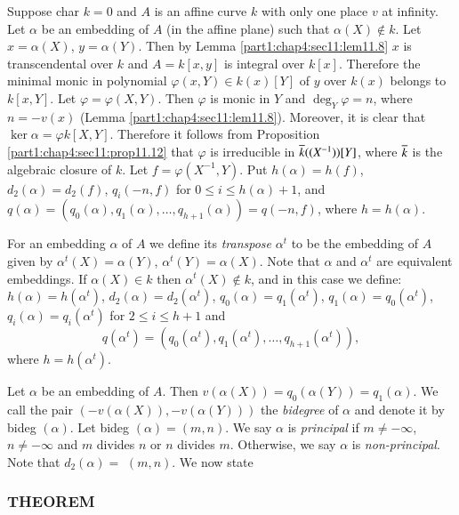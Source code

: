 Suppose char $k=0$ and $A$ is an affine curve $k$ with only one place
$v$ at infinity. Let $\alpha$ be an embedding of $A$ (in the affine
plane) such that $\alpha (X)\notin k$. Let $x= \alpha (X)$, $y= \alpha
(Y)$. Then by Lemma \ref{part1:chap4:sec11:lem11.8} $x$ is
transcendental over $k$ and $A = k[x, y]$ is integral over
$k[x]$. Therefore the minimal monic in polynomial $\varphi (x,Y) \in k (x)[Y]$ of $y$ over $k(x)$ belongs to $k[x,Y]$. Let $\varphi = \varphi (X,Y)$. Then $\varphi$ is monic in $Y$ and $\deg_Y \varphi=n$, where $n= - v(x)$ (Lemma \ref{part1:chap4:sec11:lem11.8}). Moreover,
it is clear that $\ker  \alpha = \varphi k[X, Y]$. Therefore it
follows from Proposition \ref{part1:chap4:sec11:prop11.12} that
$\varphi$ is irreducible in $\overline{k} ((X^{-1})) [Y]$, where $\overline{k}$ is
the algebraic closure of $k$. Let $f = \varphi(X^{-1}, Y)$. Put $h
(\alpha)= h(f)$, $d_2 (\alpha)= d_2 (f)$, $q_i(-n, f)$ for $0 \leq i
\leq h(\alpha)+1$, and $q(\alpha)=(q_0 (\alpha), q_1 (\alpha), \ldots
, q_{h+1} (\alpha))= q(-n, f)$, where $h= h(\alpha)$.

For an embedding $\alpha$ of $A$ we define its {\em transpose}
$\alpha^t$ to be the embedding of $A$ given by $\alpha^t (X)=
\alpha(Y)$, $\alpha^t (Y)= \alpha(X)$. Note that $\alpha$ and
$\alpha^t$ are equivalent embeddings. If $\alpha(X) \in k$ then
$\alpha^t (X) \notin k$, and in this case we define: $h(\alpha)=
h(\alpha^t)$, $d_2 (\alpha) = d_2 (\alpha^t)$, $q_0(\alpha) = q_1
(\alpha^t)$, $q_1(\alpha)= q_0 (\alpha^t)$, $q_i (\alpha)= q_i
(\alpha^t)$ for $2 \leq i \leq h+1$ and 
$$
q(\alpha^t)= (q_0 (\alpha^t), q_1 (\alpha^t), \ldots , q_{h+1} (\alpha^t)),
$$
where $h= h(\alpha^t)$.

Let $\alpha$ be an embedding of $A$. Then $v (\alpha(X))= q_0
(\alpha(Y))= q_1 (\alpha)$. We call the pair $(-v (\alpha (X)), -v
(\alpha(Y)))$ the {\em bidegree} of $\alpha$ and denote it by bideg
$(\alpha)$. Let bideg $(\alpha)= (m, n)$. We say $\alpha$ is {\em
  principal} if $m \neq - \infty$, $n \neq -\infty$ and $m$ divides
$n$ or $n$ divides $m$. Otherwise, we say $\alpha$ is {\em
  non-principal}. Note that $d_2 (\alpha) =$ \gcd $(m, n)$. We now
state 

\setcounter{mysubsection}{26}
\subsubsection{THEOREM}\label{part1:chap4:sec11:sss11.26.1}

